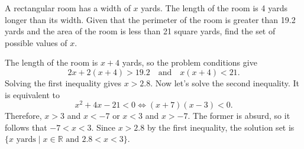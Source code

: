 \begin{question}
    A rectangular room has a width of $x$ yards. The length of the room is 4
    yards longer than its width. Given that the perimeter of the room is
    greater than 19.2 yards and the area of the room is less than 21 square
    yards, find the set of possible values of $x$.
\end{question}
\begin{solution}
    The length of the room is $x + 4$ yards, so the problem conditions give
    \[ 2x + 2(x + 4) > 19.2 \quad\text{and}\quad x(x + 4) < 21. \]
    Solving the first inequality gives $x > 2.8$. Now let's solve the second
    inequality. It is equivalent to
    \[ x^2 + 4x - 21 < 0 \Longleftrightarrow (x + 7)(x - 3) < 0.\]
    Therefore, $x > 3$ and $x < -7$ or $x < 3$ and $x > -7$. The former is
    absurd, so it follows that $-7 < x < 3$. Since $x > 2.8$ by the first
    inequality, the solution set is $\{ x \text{ yards} \mid x \in \mathbb{R}
    \text{ and } 2.8 < x < 3 \}$.
\end{solution}

